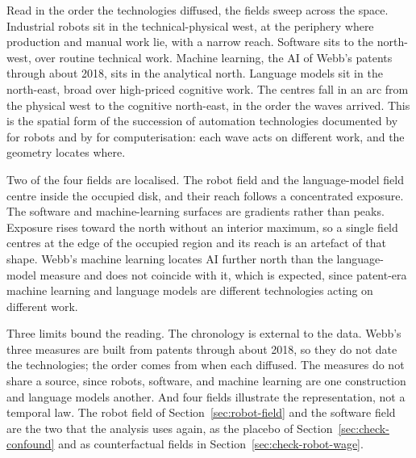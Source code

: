 \documentclass[12pt, a4paper]{article}
\begin{document}
Read in the order the technologies diffused, the fields sweep across the
space. Industrial robots sit in the technical-physical west, at the
periphery where production and manual work lie, with a narrow reach.
Software sits to the north-west, over routine technical work. Machine
learning, the AI of Webb's patents through about 2018, sits in the
analytical north. Language models sit in the north-east, broad over
high-priced cognitive work. The centres fall in an arc from the physical
west to the cognitive north-east, in the order the waves arrived. This
is the spatial form of the succession of automation technologies
documented by \textcite{acemoglu2020robots} for robots and by
\textcite{autor2003} for computerisation: each wave acts on different
work, and the geometry locates where.

Two of the four fields are localised. The robot field and the
language-model field centre inside the occupied disk, and their reach
follows a concentrated exposure. The software and machine-learning
surfaces are gradients rather than peaks. Exposure rises toward the
north without an interior maximum, so a single field centres at the edge
of the occupied region and its reach is an artefact of that shape.
Webb's machine learning locates AI further north than the language-model
measure and does not coincide with it, which is expected, since
patent-era machine learning and language models are different
technologies acting on different work.

Three limits bound the reading. The chronology is external to the data.
Webb's three measures are built from patents through about 2018, so they
do not date the technologies; the order comes from when each diffused.
The measures do not share a source, since robots, software, and machine
learning are one construction and language models another. And four
fields illustrate the representation, not a temporal law. The robot
field of Section~\ref{sec:robot-field} and the software field are the
two that the analysis uses again, as the placebo of
Section~\ref{sec:check-confound} and as counterfactual fields in
Section~\ref{sec:check-robot-wage}.
\end{document}
